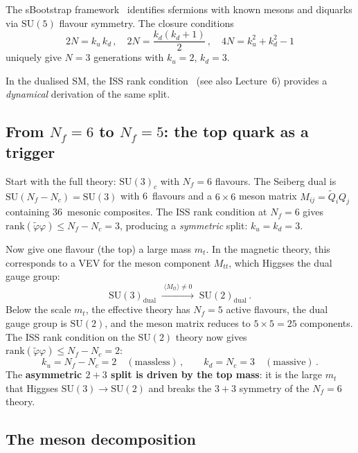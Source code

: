 \documentclass[11pt,a4paper]{article}
\newcommand{\Nc}{N_{\!c}}
\newcommand{\Nf}{N_{\!f}}
\newcommand{\SU}[1]{\mathrm{SU}(#1)}
\theoremstyle{definition}\newtheorem{exercise}{Exercise}[section]
\begin{document}
The sBootstrap framework~\cite{Rivero2009,Rivero2024} identifies
sfermions with known mesons and diquarks via $\SU{5}$ flavour
symmetry.  The closure conditions~\cite{Rivero2024}
\begin{equation}
  2N = k_u\,k_d\,,\quad
  2N = \frac{k_d(k_d+1)}{2}\,,\quad
  4N = k_u^2+k_d^2-1
\end{equation}
uniquely give $N = 3$ generations with $k_u = 2$, $k_d = 3$.

In the dualised SM, the ISS rank condition~\cite{ISS2006}
(see also Lecture~6)
provides a \emph{dynamical} derivation of the same split.

\subsection{From $\Nf = 6$ to $\Nf = 5$: the top quark as a trigger}

Start with the full theory: $\SU{3}_c$ with $\Nf = 6$ flavours.
The Seiberg dual is $\SU{\Nf-\Nc} = \SU{3}$ with 6~flavours and
a $6\times 6$ meson matrix $M_{ij} = \tilde Q_i Q_j$ containing
$36$~mesonic composites.  The ISS rank condition at $\Nf = 6$ gives
$\text{rank}(\tilde\varphi\varphi) \leq \Nf - \Nc = 3$,
producing a \emph{symmetric} split: $k_u = k_d = 3$.

Now give one flavour (the top) a large mass $m_t$.  In the
magnetic theory, this corresponds to a VEV for the meson
component $M_{tt}$, which Higgses the dual gauge group:
\begin{equation}
  \SU{3}_{\text{dual}} \;\xrightarrow{\;\langle M_{tt}\rangle \neq 0\;}
  \;\SU{2}_{\text{dual}}\,.
  \label{eq:higgsing}
\end{equation}
Below the scale $m_t$, the effective theory has $\Nf = 5$ active
flavours, the dual gauge group is $\SU{2}$, and the meson matrix
reduces to $5 \times 5 = 25$ components.  The ISS rank condition
on the $\SU{2}$ theory now gives
$\text{rank}(\tilde\varphi\varphi) \leq \Nf - \Nc = 2$:
\begin{equation}
  k_u = \Nf - \Nc = 2 \quad(\text{massless})\,,\qquad
  k_d = \Nc = 3 \quad(\text{massive})\,.
  \label{eq:iss-split}
\end{equation}
The \textbf{asymmetric $2+3$ split is driven by the top mass}:
it is the large $m_t$ that Higgses $\SU{3} \to \SU{2}$ and
breaks the $3+3$ symmetry of the $\Nf = 6$ theory.

\subsection{The meson decomposition}
\end{document}
